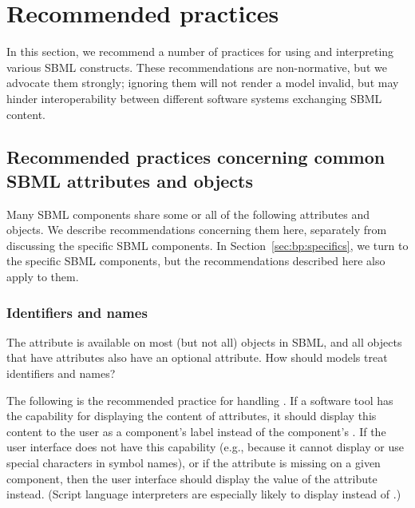
\section{Recommended practices}
\label{sec:best-practices}

In this section, we recommend a number of practices for using and
interpreting various SBML constructs.  These recommendations are
non-normative, but we advocate them strongly; ignoring them will
not render a model invalid, but may hinder interoperability
between different software systems exchanging SBML content.


\subsection{Recommended practices concerning common SBML
  attributes and objects}
\label{sec:bp:common}

Many SBML components share some or all of the following attributes
and objects.  We describe recommendations concerning them here,
separately from discussing the specific SBML components.  In
Section~\ref{sec:bp:specifics}, we turn to the specific SBML
components, but the recommendations described here also apply to
them.


\subsubsection{Identifiers and names}
\label{sec:bp:names}

The  attribute is available on most (but not all)
objects in SBML, and all objects that have  attributes
also have an optional  attribute.  How should models
treat identifiers and names?

The following is the recommended practice for handling
.  If a software tool has the capability for
displaying the content of  attributes, it should
display this content to the user as a component's label instead of
the component's .  If the user interface does not have
this capability (e.g., because it cannot display or use special
characters in symbol names), or if the  attribute is
missing on a given component, then the user interface should
display the value of the  attribute instead.  (Script
language interpreters are especially likely to display 
instead of .)

